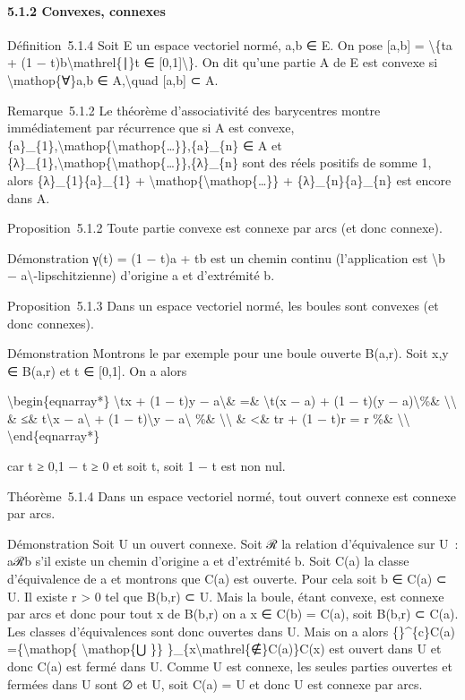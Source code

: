 \documentclass[]{article}
\begin{document}
\paragraph{5.1.2 Convexes, connexes}

Définition~5.1.4 Soit E un espace vectoriel normé, a,b ∈ E. On pose
{[}a,b{]} = \textbackslash{}\{ta + (1 − t)b\textbackslash{}mathrel\{∣\}t
∈ {[}0,1{]}\textbackslash{}\}. On dit qu'une partie A de E est convexe
si \textbackslash{}mathop\{∀\}a,b ∈ A,\textbackslash{}quad {[}a,b{]} ⊂
A.

Remarque~5.1.2 Le théorème d'associativité des barycentres montre
immédiatement par récurrence que si A est convexe,
\{a\}\_\{1\},\textbackslash{}mathop\{\textbackslash{}mathop\{\ldots{}\}\},\{a\}\_\{n\}
∈ A et
\{λ\}\_\{1\},\textbackslash{}mathop\{\textbackslash{}mathop\{\ldots{}\}\},\{λ\}\_\{n\}
sont des réels positifs de somme 1, alors \{λ\}\_\{1\}\{a\}\_\{1\} +
\textbackslash{}mathop\{\textbackslash{}mathop\{\ldots{}\}\} +
\{λ\}\_\{n\}\{a\}\_\{n\} est encore dans A.

Proposition~5.1.2 Toute partie convexe est connexe par arcs (et donc
connexe).

Démonstration γ(t) = (1 − t)a + tb est un chemin continu (l'application
est \textbackslash{}\textbar{}b −
a\textbackslash{}\textbar{}-lipschitzienne) d'origine a et d'extrémité
b.

Proposition~5.1.3 Dans un espace vectoriel normé, les boules sont
convexes (et donc connexes).

Démonstration Montrons le par exemple pour une boule ouverte B(a,r).
Soit x,y ∈ B(a,r) et t ∈ {[}0,1{]}. On a alors

\textbackslash{}begin\{eqnarray*\} \textbackslash{}\textbar{}tx + (1 −
t)y − a\textbackslash{}\textbar{}\& =\& \textbackslash{}\textbar{}t(x −
a) + (1 − t)(y − a)\textbackslash{}\textbar{}\%\&
\textbackslash{}\textbackslash{} \& ≤\& t\textbackslash{}\textbar{}x −
a\textbackslash{}\textbar{} + (1 − t)\textbackslash{}\textbar{}y −
a\textbackslash{}\textbar{} \%\& \textbackslash{}\textbackslash{} \&
\textless{}\& tr + (1 − t)r = r \%\& \textbackslash{}\textbackslash{}
\textbackslash{}end\{eqnarray*\}

car t ≥ 0,1 − t ≥ 0 et soit t, soit 1 − t est non nul.

Théorème~5.1.4 Dans un espace vectoriel normé, tout ouvert connexe est
connexe par arcs.

Démonstration Soit U un ouvert connexe. Soit ℛ la relation d'équivalence
sur U~: aℛb s'il existe un chemin d'origine a et d'extrémité b. Soit
C(a) la classe d'équivalence de a et montrons que C(a) est ouverte. Pour
cela soit b ∈ C(a) ⊂ U. Il existe r \textgreater{} 0 tel que B(b,r) ⊂ U.
Mais la boule, étant convexe, est connexe par arcs et donc pour tout x
de B(b,r) on a x ∈ C(b) = C(a), soit B(b,r) ⊂ C(a). Les classes
d'équivalences sont donc ouvertes dans U. Mais on a alors
\{\}\^{}\{c\}C(a) =\{\textbackslash{}mathop\{ \textbackslash{}mathop\{⋃
\}\} \}\_\{x\textbackslash{}mathrel\{∉\}C(a)\}C(x) est ouvert dans U et
donc C(a) est fermé dans U. Comme U est connexe, les seules parties
ouvertes et fermées dans U sont ∅ et U, soit C(a) = U et donc U est
connexe par arcs.
\end{document}
